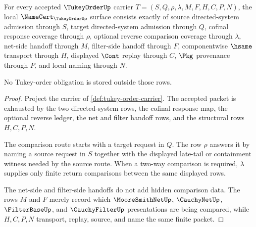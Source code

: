 \begin{theorem}
\label{thm:tukey-order-namecert-obligations}
For every accepted $\TukeyOrderUp$ carrier $T=(S,Q,\rho,\lambda,M,F,H,C,P,N)$, the local $\NameCert_{\TukeyOrderUp}$ surface consists exactly of source directed-system admission through $S$, target directed-system admission through $Q$, cofinal response coverage through $\rho$, optional reverse comparison coverage through $\lambda$, net-side handoff through $M$, filter-side handoff through $F$, componentwise $\hsame$ transport through $H$, displayed $\Cont$ replay through $C$, $\Pkg$ provenance through $P$, and local naming through $N$.

No Tukey-order obligation is stored outside those rows.
\end{theorem}
\begin{proof}
Project the carrier of \autoref{def:tukey-order-carrier}. The accepted packet is exhausted by the two directed-system rows, the cofinal response map, the optional reverse ledger, the net and filter handoff rows, and the structural rows $H,C,P,N$.

The comparison route starts with a target request in $Q$. The row $\rho$ answers it by naming a source request in $S$ together with the displayed late-tail or containment witness needed by the source route. When a two-way comparison is required, $\lambda$ supplies only finite return comparisons between the same displayed rows.

The net-side and filter-side handoffs do not add hidden comparison data. The rows $M$ and $F$ merely record which $\MooreSmithNetUp$, $\CauchyNetUp$, $\FilterBaseUp$, and $\CauchyFilterUp$ presentations are being compared, while $H,C,P,N$ transport, replay, source, and name the same finite packet.
\end{proof}

